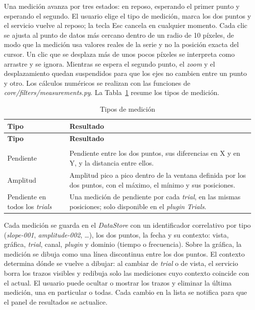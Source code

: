 \documentclass[12pt,letterpaper,oneside]{article}
\DeclareRobustCommand{\_}{\textunderscore\allowbreak}
\begin{document}
Una medición avanza por tres estados: en reposo, esperando el primer punto y esperando el segundo. El usuario elige el tipo de medición, marca los dos puntos y el servicio vuelve al reposo; la tecla Esc cancela en cualquier momento. Cada clic se ajusta al punto de datos más cercano dentro de un radio de 10 píxeles, de modo que la medición usa valores reales de la serie y no la posición exacta del cursor. Un clic que se desplaza más de unos pocos píxeles se interpreta como arrastre y se ignora. Mientras se espera el segundo punto, el \textit{zoom} y el desplazamiento quedan suspendidos para que los ejes no cambien entre un punto y otro. Los cálculos numéricos se realizan con las funciones de \textit{core/filters/measurements.py}. La Tabla~\ref{tab:sdd_mediciones} resume los tipos de medición.

\begin{center}
\small
\begin{longtable}{|p{}|p{}|}
\hline
\textbf{Tipo} & \textbf{Resultado} \\
\hline
\endfirsthead
\hline
\textbf{Tipo} & \textbf{Resultado} \\
\hline
\endhead
\hline
\endfoot
\hline
\caption{Tipos de medición} \label{tab:sdd_mediciones} \\
\endlastfoot
Pendiente & Pendiente entre los dos puntos, sus diferencias en X y en Y, y la distancia entre ellos. \\
\hline
Amplitud & Amplitud pico a pico dentro de la ventana definida por los dos puntos, con el máximo, el mínimo y sus posiciones. \\
\hline
Pendiente en todos los \textit{trials} & Una medición de pendiente por cada \textit{trial}, en las mismas posiciones; solo disponible en el \textit{plugin} \textit{Trials}. \\
\hline
\end{longtable}
\end{center}

Cada medición se guarda en el \textit{DataStore} con un identificador correlativo por tipo (\textit{slope-001}, \textit{amplitude-002}, \ldots), los dos puntos, la fecha y su contexto: vista, gráfica, \textit{trial}, canal, \textit{plugin} y dominio (tiempo o frecuencia). Sobre la gráfica, la medición se dibuja como una línea discontinua entre los dos puntos. El contexto determina dónde se vuelve a dibujar: al cambiar de \textit{trial} o de vista, el servicio borra los trazos visibles y redibuja solo las mediciones cuyo contexto coincide con el actual. El usuario puede ocultar o mostrar los trazos y eliminar la última medición, una en particular o todas. Cada cambio en la lista se notifica para que el panel de resultados se actualice.
\end{document}
